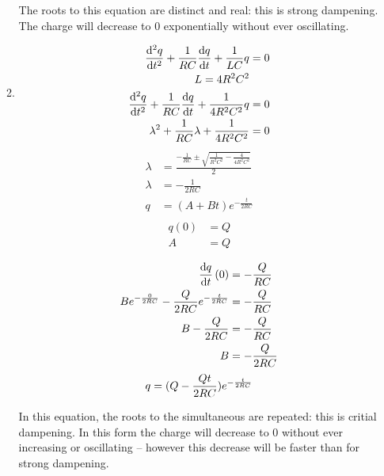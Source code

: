\documentclass[10pt,\jkfside,a4paper]{article}
\begin{document}
\begin{enumerate}
\begin{enumerate}
The roots to this equation are distinct and real: this is strong dampening. 
The charge will decrease to 0 exponentially without ever oscillating.

\item
\begin{equation}
\begin{split}
\dv[2]{q}{t} + \frac{1}{RC}\dv{q}{t} + \frac{1}{LC}q &= 0\\
L = 4R^2C^2&\\
\dv[2]{q}{t} + \frac{1}{RC}\dv{q}{t} + \frac{1}{4R^2C^2}q &= 0\\
\lambda^2 + \frac{1}{RC}\lambda + \frac{1}{4R^2C^2} &= 0\\
\end{split}
\end{equation}
\begin{equation}
\begin{split}
\lambda &= \frac{-\frac{1}{RC} \pm \sqrt{\frac{1}{R^2C^2} - \frac{4}{4R^2C^2}}}{2}\\
\lambda &= -\frac{1}{2RC}\\
q &= (A + Bt)e^{-\frac{t}{2RC}}\\
\end{split}
\end{equation}
\begin{equation}
\begin{split}
q(0) &= Q\\
A &= Q\\
\end{split}
\end{equation}
\begin{equation}
\begin{split}
\dv{q}{t}\left(0\right) &= -\frac{Q}{RC}\\
Be^{-\frac{0}{2RC}} - \frac{Q}{2RC}e^{-\frac{t}{2RC}} &= -\frac{Q}{RC}\\
B - \frac{Q}{2RC} &= -\frac{Q}{RC}\\
B &= -\frac{Q}{2RC}\\
\end{split}
\end{equation}
\begin{equation}
q = (Q - \frac{Qt}{2RC})e^{-\frac{t}{2RC}}\\
\end{equation}

In this equation, the roots to the simultaneous are repeated: this is critial dampening. 
In this form the charge will decrease to 0 without ever increasing 
or oscillating -- however this decrease will be faster than for strong dampening.


\end{enumerate}
\end{enumerate}
\end{document}
